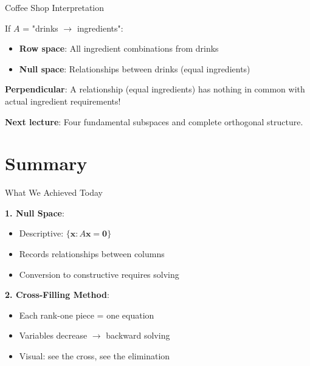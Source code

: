 \documentclass[10pt]{beamer}
\theoremstyle{definition}
\newcommand{\x}[1]{\alert{\textbf{#1}}}
\begin{document}
\begin{frame}{Coffee Shop Interpretation}

If $A$ = "drinks $\to$ ingredients":

\begin{itemize}
\item \textbf{Row space}: All ingredient combinations from drinks
\item \textbf{Null space}: Relationships between drinks (equal ingredients)
\end{itemize}

\vspace{1em}

\x{Perpendicular}: A relationship (equal ingredients) has nothing in common with actual ingredient requirements!

\vspace{1em}

\x{Next lecture}: Four fundamental subspaces and complete orthogonal structure.

\end{frame}

\section{Summary}

\begin{frame}{What We Achieved Today}

\x{1. Null Space}:
\begin{itemize}
\item Descriptive: $\{\mathbf{x} : A\mathbf{x} = \mathbf{0}\}$
\item Records relationships between columns
\item Conversion to constructive requires solving
\end{itemize}

\vspace{0.5em}

\x{2. Cross-Filling Method}:
\begin{itemize}
\item Each rank-one piece = one equation
\item Variables decrease $\to$ backward solving
\item Visual: see the cross, see the elimination
\end{itemize}

\end{frame}
\end{document}

